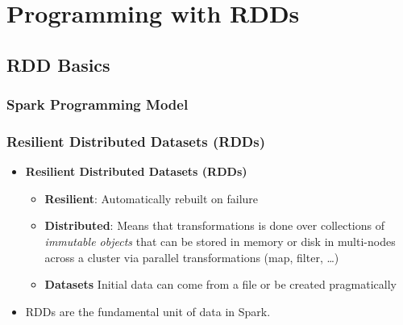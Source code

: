 \section{Programming with RDDs}
%
%
%


%
%
%

\subsection{RDD Basics}
\subsubsection{Spark Programming Model}

\begin{frame}
  \frametitle{Resilient Distributed Datasets (RDDs)}
	\begin{itemize}[<+->]
		\item \textbf{Resilient Distributed Datasets (RDDs)}
			\begin{itemize}
				\item \textbf{Resilient}: Automatically rebuilt on failure
				\item \textbf{Distributed}: Means that transformations is done over collections of \textit{immutable objects} that can be stored in memory or disk in multi-nodes across a cluster via parallel transformations (map, filter, …)
				\item \textbf{Datasets} Initial data can come from a file or be created pragmatically
			\end{itemize}
	\item RDDs are the fundamental unit of data in Spark.
	\end{itemize}
\end{frame}
%
%
%


